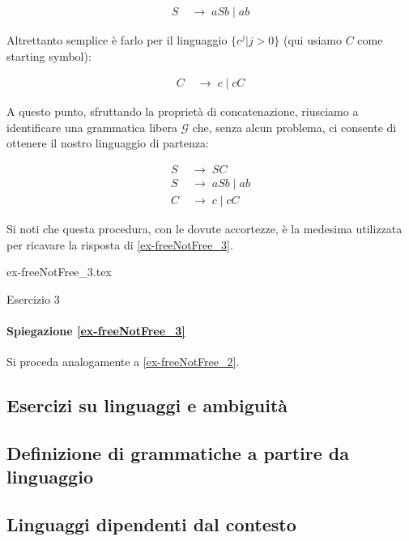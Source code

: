 \documentclass[class=book, crop=false, oneside]{standalone}
\begin{document}
\begin{align*}
  S\; & \to\; aSb\; |\; ab
\end{align*}

\noindent Altrettanto semplice è farlo per il linguaggio $ \{ c^j | j > 0 \} $ (qui usiamo $C$ come starting symbol):

\begin{align*}
  C\; & \to\; c\; |\; cC
\end{align*}

\noindent A questo punto, sfruttando la proprietà di concatenazione, riusciamo a identificare una grammatica libera $\mathcal{G}$ che, senza alcun problema, ci consente di ottenere il nostro linguaggio di partenza:

\begin{align*}
  S\; & \to\; SC \\
  S\; & \to\; aSb\; |\; ab \\
  C\; & \to\; c\; |\; cC
\end{align*}

\noindent Si noti che questa procedura, con le dovute accortezze, è la medesima utilizzata per ricavare la risposta di \ref{ex-freeNotFree_3}.

\begin{table}[H]
	\centering
	{ex-freeNotFree_3.tex}
    \caption{Esercizio 3}
    \label{ex-freeNotFree_3}
\end{table}

\paragraph{Spiegazione \ref{ex-freeNotFree_3}}
Si proceda analogamente a \ref{ex-freeNotFree_2}.

\subsection*{Esercizi su linguaggi e ambiguità}

\subsection*{Definizione di grammatiche a partire da linguaggio}

\subsection*{Linguaggi dipendenti dal contesto}
\end{document}

